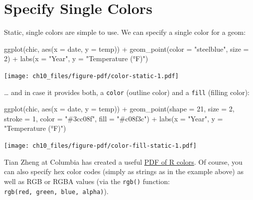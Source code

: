 \documentclass[
  letterpaper,
]{scrbook}
\newenvironment{Shaded}{\begin{snugshade}}{\end{snugshade}}
\newcommand{\AttributeTok}[1]{\textcolor[rgb]{0.40,0.45,0.13}{#1}}
\newcommand{\DecValTok}[1]{\textcolor[rgb]{0.68,0.00,0.00}{#1}}
\newcommand{\FunctionTok}[1]{\textcolor[rgb]{0.28,0.35,0.67}{#1}}
\newcommand{\NormalTok}[1]{\textcolor[rgb]{0.00,0.23,0.31}{#1}}
\newcommand{\SpecialCharTok}[1]{\textcolor[rgb]{0.37,0.37,0.37}{#1}}
\newcommand{\StringTok}[1]{\textcolor[rgb]{0.13,0.47,0.30}{#1}}
\begin{document}
\section{Specify Single Colors}\label{specify-single-colors}

Static, single colors are simple to use. We can specify a single color
for a geom:

\begin{Shaded}
\begin{Highlighting}[]
\FunctionTok{ggplot}\NormalTok{(chic, }\FunctionTok{aes}\NormalTok{(}\AttributeTok{x =}\NormalTok{ date, }\AttributeTok{y =}\NormalTok{ temp)) }\SpecialCharTok{+}
  \FunctionTok{geom\_point}\NormalTok{(}\AttributeTok{color =} \StringTok{"steelblue"}\NormalTok{, }\AttributeTok{size =} \DecValTok{2}\NormalTok{) }\SpecialCharTok{+}
  \FunctionTok{labs}\NormalTok{(}\AttributeTok{x =} \StringTok{"Year"}\NormalTok{, }\AttributeTok{y =} \StringTok{"Temperature (°F)"}\NormalTok{)}
\end{Highlighting}
\end{Shaded}

\texttt{[image: ch10\_files/figure-pdf/color-static-1.pdf]}

\ldots{} and in case it provides both, a \texttt{color} (outline color)
and a \texttt{fill} (filling color):

\begin{Shaded}
\begin{Highlighting}[]
\FunctionTok{ggplot}\NormalTok{(chic, }\FunctionTok{aes}\NormalTok{(}\AttributeTok{x =}\NormalTok{ date, }\AttributeTok{y =}\NormalTok{ temp)) }\SpecialCharTok{+}
  \FunctionTok{geom\_point}\NormalTok{(}\AttributeTok{shape =} \DecValTok{21}\NormalTok{, }\AttributeTok{size =} \DecValTok{2}\NormalTok{, }\AttributeTok{stroke =} \DecValTok{1}\NormalTok{,}
             \AttributeTok{color =} \StringTok{"\#3cc08f"}\NormalTok{, }\AttributeTok{fill =} \StringTok{"\#c08f3c"}\NormalTok{) }\SpecialCharTok{+}
  \FunctionTok{labs}\NormalTok{(}\AttributeTok{x =} \StringTok{"Year"}\NormalTok{, }\AttributeTok{y =} \StringTok{"Temperature (°F)"}\NormalTok{)}
\end{Highlighting}
\end{Shaded}

\texttt{[image: ch10\_files/figure-pdf/color-fill-static-1.pdf]}

Tian Zheng at Columbia has created a useful
\href{http://www.stat.columbia.edu/~tzheng/files/Rcolor.pdf}{PDF of R
colors}. Of course, you can also specify hex color codes (simply as
strings as in the example above) as well as RGB or RGBA values (via the
\texttt{rgb()} function: \texttt{rgb(red,\ green,\ blue,\ alpha)}).
\end{document}
